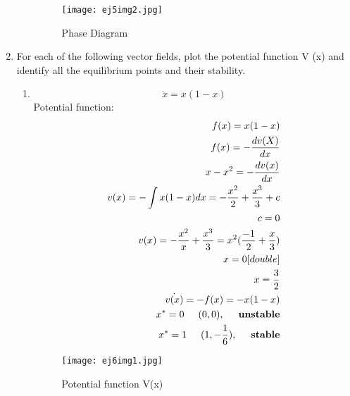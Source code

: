 \documentclass[a4paper,10pt]{article}
\begin{document}
\begin{enumerate}
\begin{enumerate}
                \begin{figure}[h]
                    \centering
                    \texttt{[image: ej5img2.jpg]}
                    \caption{Phase Diagram }
                    \label{fig:mesh1}
                \end{figure}
                
    \end{enumerate}
    \newpage
    \item For each of the following vector fields, plot the potential function V (x) and identify all the equilibrium points and their stability.
    \begin{enumerate}
        \item
            \begin{equation}
                \dot{x}=x(1-x)
            \end{equation}
             Potential function:
            \begin{equation}
                \begin{aligned}
                    f(x)= x(1-x)\\
                    f(x)=-\frac{dv(X)}{dx}\\
                    x-x^2=-\frac{dv(x)}{dx}\\
                    v(x)= - \int x(1-x)dx= -\frac{x^2}{2}+ \frac{x^3}{3}+ c\\
                    c=0\\
                    v(x)= -\frac{x^2}{x} + \frac{x^3}{3}= x^2(\frac{-1}{2}+ \frac{x}{3})\\
                    x= 0 [double]\\
                    x= \frac{3}{2}\\
                    \dot{v(x)}=- f(x)=-x(1-x)\\
                    x^{*}=0 \hspace{0.5cm}(0,0),\hspace{0.5cm}\textbf{unstable} \\
                    x^{*}=1 \hspace{0.5cm}(1,-\frac{1}{6}),\hspace{0.5cm} \textbf{stable}
                \end{aligned}
            \end{equation}
                \begin{figure}[h]
                    \centering
                    \texttt{[image: ej6img1.jpg]}
                    \caption{Potential function V(x)}

\end{figure}
\end{enumerate}
\end{enumerate}
\end{document}
